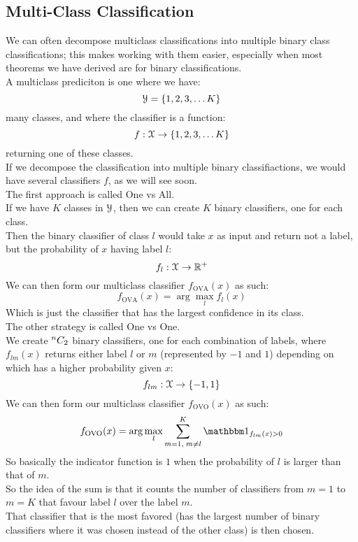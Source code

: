 \documentclass[12pt]{article}
\begin{document}
\newpage

\subsection*{Multi-Class Classification}

We can often decompose multiclass classifications
into multiple binary class classifications;
this makes working with them easier,
especially when most theorems we have derived 
are for binary classifications. \\

A multiclass prediciton is one where we have:
\[ \mathcal{Y} = \{1, 2, 3, \dots K\} \]
many classes, and where the classifier is
a function:
\[ f: \mathcal{X} \to \{1, 2, 3, \dots K\} \]
returning one of these classes. \\

If we decompose the classification into multiple
binary classifiactions,
we would have several classifiers $f$,
as we will see soon. \\

The first approach is called One vs All. \\
If we have $K$ classes in $\mathcal{Y}$,
then we can create $K$ binary classifiers,
one for each class. \\
Then the binary classifier of class $l$
would take $x$ as input and return
not a label, but the probability of $x$
having label $l$: 
\[ f_l: \mathcal{X} \to \mathbb{R}^+ \]
We can then form our multiclass classifier
$f_{\text{OVA}}(x)$ as such:
\[ f_{\text{OVA}}(x) = 
\arg \max_l f_l(x)  \]
Which is just the classifier that 
has the largest confidence in its class. \\

The other strategy is called One vs One. \\
We create ${}^{n}C_{2}$
binary classifiers, 
one for each combination of labels,
where $f_{lm}(x)$
returns either label $l$ or $m$
(represented by $-1$ and $1$)
depending on which has a higher probability
given $x$:
\[ f_{lm}: \mathcal{X} \to \{-1, 1\} \]
We can then form our multiclass classifier
$f_{\text{OVO}}(x)$ as such:
\[ f_{\text{OVO}}(x) = 
\arg \max_l \sum_{m=1, \; m \neq l}^{K} 
\indicator_{f_{lm}(x) > 0}  \]
So basically the indicator function
is $1$ when the probability of $l$
is larger than that of $m$. \\
So the idea of the sum is that it counts
the number of classifiers from $m=1$
to $m=K$ that favour label $l$
over the label $m$. \\
That classifier that is the most favored
(has the largest number of binary classifiers
where it was chosen instead of the other class)
is then chosen. \\
\end{document}
